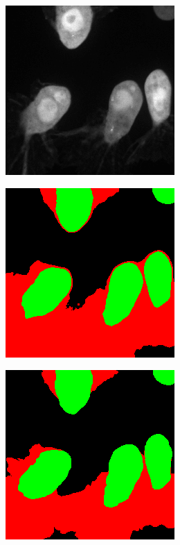 \begin {figure}[!htb]
	\centering
	\begin {subfigure}[b]{0.25\linewidth}
		\includegraphics[scale=0.45]{img/fig_quali_tile3.png}
	\end {subfigure}\hspace{0.5cm}
	\begin {subfigure}[b]{0.25\linewidth}
		\includegraphics[scale=0.45]{img/fig_quali_tile3_pred_c3.png}
	\end {subfigure}\hspace{0.5cm}
	\begin {subfigure}[b]{0.25\linewidth}
		\includegraphics[scale=0.45]{img/fig_quali_tile3_pred_c3_GT.png}

\end{subfigure}
\end{figure}
